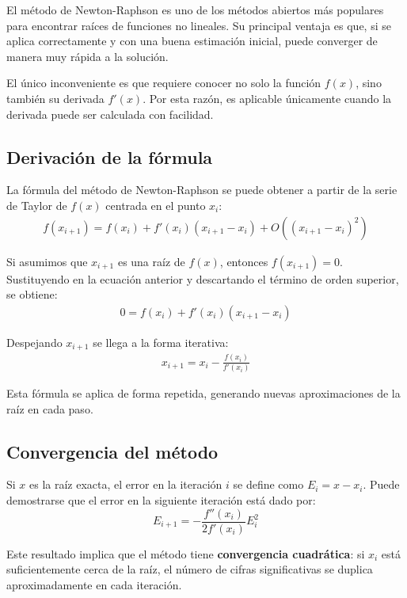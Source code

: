 \documentclass[12pt,letterpaper]{article}
\theoremstyle{definition}
\theoremstyle{plain}
\theoremstyle{remark}
\begin{document}
El método de Newton-Raphson es uno de los métodos abiertos más populares para encontrar raíces de funciones no lineales. Su principal ventaja es que, si se aplica correctamente y con una buena estimación inicial, puede converger de manera muy rápida a la solución.

El único inconveniente es que requiere conocer no solo la función $f(x)$, sino también su derivada $f'(x)$. Por esta razón, es aplicable únicamente cuando la derivada puede ser calculada con facilidad.

\subsection*{Derivación de la fórmula}

La fórmula del método de Newton-Raphson se puede obtener a partir de la serie de Taylor de $f(x)$ centrada en el punto $x_i$:
\begin{align}
f(x_{i+1}) = f(x_i) + f'(x_i)(x_{i+1}-x_i) + O((x_{i+1}-x_i)^2) \label{eq:6}
\end{align}

Si asumimos que $x_{i+1}$ es una raíz de $f(x)$, entonces $f(x_{i+1}) = 0$. Sustituyendo en la ecuación anterior y descartando el término de orden superior, se obtiene:
\begin{align}
0 = f(x_i) + f'(x_i)(x_{i+1}-x_i) \label{eq:7}
\end{align}

Despejando $x_{i+1}$ se llega a la forma iterativa:
\begin{align}
x_{i+1} = x_i - \frac{f(x_i)}{f'(x_i)} \label{eq:8}
\end{align}

Esta fórmula se aplica de forma repetida, generando nuevas aproximaciones de la raíz en cada paso.

\subsection*{Convergencia del método}

Si $x$ es la raíz exacta, el error en la iteración $i$ se define como $E_i = x - x_i$. Puede demostrarse que el error en la siguiente iteración está dado por:
\[
E_{i+1} = - \frac{f''(x_i)}{2f'(x_i)} E_i^2
\]

Este resultado implica que el método tiene {\bf convergencia cuadrática}: si $x_i$ está suficientemente cerca de la raíz, el número de cifras significativas se duplica aproximadamente en cada iteración.
\end{document}
